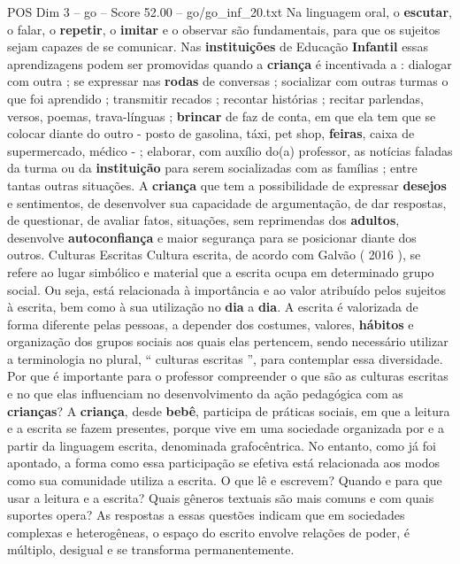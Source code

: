 \begin{textsample}{POS Dim 3 – go – Score 52.00 – go/go\_inf\_20.txt}
Na linguagem oral, o \textbf{escutar}, o falar, o \textbf{repetir}, o \textbf{imitar} e o observar são fundamentais, para que os sujeitos sejam capazes de se comunicar.
Nas \textbf{instituições} de Educação \textbf{Infantil} essas aprendizagens podem ser promovidas quando a \textbf{criança} é incentivada a : dialogar com outra ; se expressar nas \textbf{rodas} de conversas ; socializar com outras turmas o que foi aprendido ; transmitir recados ; recontar histórias ; recitar parlendas, versos, poemas, trava-línguas ; \textbf{brincar} de faz de conta, em que ela tem que se colocar diante do outro - posto de gasolina, táxi, pet shop, \textbf{feiras}, caixa de supermercado, médico - ; elaborar, com auxílio do(a) professor, as notícias faladas da turma ou da \textbf{instituição} para serem socializadas com as famílias ; entre tantas outras situações.
A \textbf{criança} que tem a possibilidade de expressar \textbf{desejos} e sentimentos, de desenvolver sua capacidade de argumentação, de dar respostas, de questionar, de avaliar fatos, situações, sem reprimendas dos \textbf{adultos}, desenvolve \textbf{autoconfiança} e maior segurança para se posicionar diante dos outros.
Culturas Escritas Cultura escrita, de acordo com Galvão ( 2016 ), se refere ao lugar simbólico e material que a escrita ocupa em determinado grupo social.
Ou seja, está relacionada à importância e ao valor atribuído pelos sujeitos à escrita, bem como à sua utilização no \textbf{dia} a \textbf{dia}.
A escrita é valorizada de forma diferente pelas pessoas, a depender dos costumes, valores, \textbf{hábitos} e organização dos grupos sociais aos quais elas pertencem, sendo necessário utilizar a terminologia no plural, “ culturas escritas ”, para contemplar essa diversidade.
Por que é importante para o professor compreender o que são as culturas escritas e no que elas influenciam no desenvolvimento da ação pedagógica com as \textbf{crianças}?
A \textbf{criança}, desde \textbf{bebê}, participa de práticas sociais, em que a leitura e a escrita se fazem presentes, porque vive em uma sociedade organizada por e a partir da linguagem escrita, denominada grafocêntrica.
No entanto, como já foi apontado, a forma como essa participação se efetiva está relacionada aos modos como sua comunidade utiliza a escrita.
O que lê e escrevem?
Quando e para que usar a leitura e a escrita?
Quais gêneros textuais são mais comuns e com quais suportes opera?
As respostas a essas questões indicam que em sociedades complexas e heterogêneas, o espaço do escrito envolve relações de poder, é múltiplo, desigual e se transforma permanentemente.

\end{textsample}
